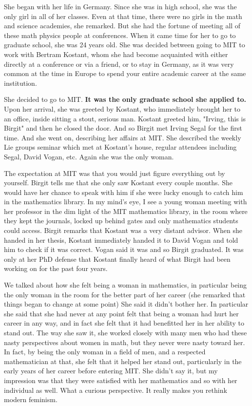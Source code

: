 \documentclass[12pt]{article}
\begin{document}
\hfill

She began with her life in Germany. Since she was in high school, she was the only girl in all of her classes. Even at that time, there were no girls in the math and science academies, she remarked.
But she had the fortune of meeting all of these math physics people at conferences. When it came time for her to go to graduate school, she was 24 years old. She was decided between going to
MIT to work with Bertram Kostant, whom she had become acquainted with either directly at a conference or via a friend, or to stay in Germany, as it was very common at the time in Europe
to spend your entire academic career at the same institution.

\hfill

She decided to go to MIT. \textbf{ It was the only graduate school she applied to.} Upon her arrival, she was greeted by Kostant, who immediately brought her to an office,
inside sitting a stout, serious man. Kostant greeted him, "Irving, this is Birgit" and then he closed the door. And so Birgit met Irving Segal for the first time. 
And she went on, describing her affairs at MIT. She described the weekly Lie groups seminar which met at Kostant's house, regular attendees including Segal, David Vogan, etc. Again she was the only woman. 

\hfill

The expectation at MIT was that you would just figure everything out by yourself. Birgit tells me that she only saw Kostant every couple months. She would have her chance to speak with him if 
she were lucky enough to catch him in the mathematics library. In my mind's eye, I see a young woman meeting with her professor in the dim light of the MIT mathematics library, in the room 
where they kept the journals, locked up behind gates and only mathematics students could access. Birgit remarks that Kostant was a very distant advisor. When she handed in her thesis, 
Kostant immediately handed it to David Vogan and told him to check if it was correct. Vogan said it was and so Birgit graduated. It was only at her PhD defense that Kostant finally heard of 
what Birgit had been working on for the past four years. 

\hfill

We talked about how she felt being a woman in mathematics, in particular being the only woman in the room for the better part of her career (she remarked that things began to change at some point)
She said it didn't bother her. In particular she said that she had never at any point felt that being a woman had hurt her career in any way, and in fact she felt that
it had benefitted her in her ability to stand out. The way she saw it, she worked closely with many men who had these nasty perspectives about women in math, but they never were nasty toward her.
In fact, by being the only woman in a field of men, and a respected mathematician at that, she felt that it helped her stand out, particularly in the early years of her career before entering MIT.
She didn't say it, but my impression was that they were satisfied with her mathematics and so with her individual as well. What a curious perspective. It really makes you rethink
modern feminism.
\end{document}
